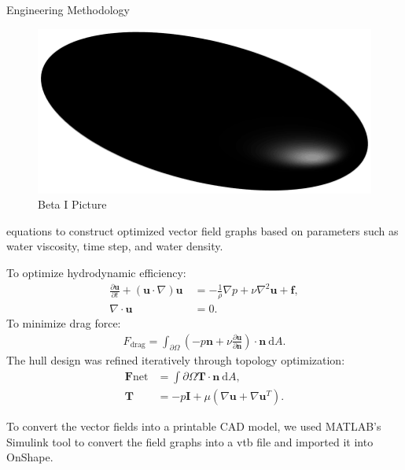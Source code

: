 \documentclass[final, 16pt]{beamer}
\newlength{\colwidth}
\newlength{\twocolwidth}
\begin{document}
\begin{frame}[t]
\begin{columns}[t]
\begin{column}{\twocolwidth}
\begin{block}{Engineering Methodology}
\begin{minipage}[t]{0.48\linewidth}
       \begin{figure}
        \centering
        \includegraphics[scale=0.35]{img/Topological_Model.png}
        \caption{Beta I Picture}
        \label{fig:beta-i}
      \end{figure}

      equations to construct optimized vector field graphs based on parameters such as water viscosity, time step, and water density. 
      
      \vspace{1cm}
      To optimize hydrodynamic efficiency:
      \begin{align*} \frac{\partial \mathbf{u}}{\partial t} + (\mathbf{u} \cdot \nabla) \mathbf{u} \ &= -\frac{1}{\rho} \nabla p + \nu \nabla^2 \mathbf{u} + \mathbf{f}, \\ \nabla \cdot \mathbf{u} &= 0. \end{align*}
      To minimize drag force:
      \begin{align*} F_\text{drag} = \int_{\partial\Omega} \left( -p \mathbf{n} + \nu \frac{\partial \mathbf{u}}{\partial \mathbf{n}} \right) \cdot \mathbf{n} \ \mathrm{d}A. \end{align*}
      The hull design was refined iteratively through topology optimization:
      \begin{align*} \mathbf{F}\text{net} &= \int{\partial\Omega} \mathbf{T} \cdot \mathbf{n} \ \mathrm{d}A, \\ \mathbf{T} &= -p \mathbf{I} + \mu \left( \nabla \mathbf{u} + \nabla \mathbf{u}^T \right). \end{align*}
      
      To convert the vector fields into a printable CAD model, we used MATLAB's Simulink tool to convert the field graphs into a vtb file and imported it into OnShape.

      \vspace{1cm}

    \end{minipage}\hfill%
    \begin{minipage}[t]{0.48\linewidth}


\end{minipage}
\end{block}
\end{column}
\end{columns}
\end{frame}
\end{document}
